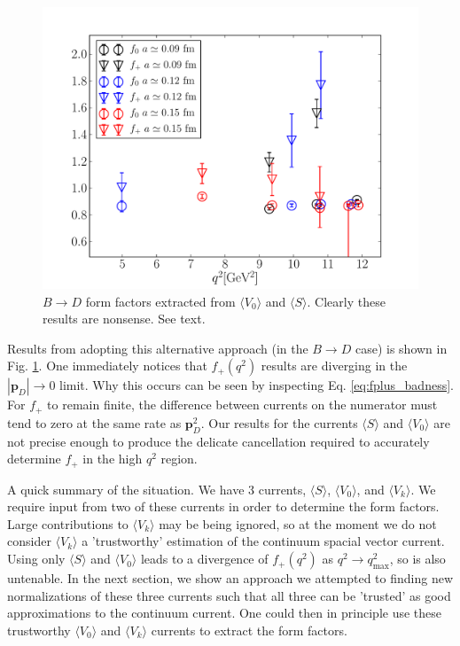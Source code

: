 \begin{figure}[htb!]
  \begin{center}
    \includegraphics[width=1.0\textwidth]{images/nrqcd/BD_formfactors_fromV0S.pdf}
  \end{center}
  \caption{$B\to D$ form factors extracted from $\langle V_0 \rangle$ and $\langle S \rangle$. Clearly these results are nonsense. See text. \label{fig:f0fp_fromV0S}}
\end{figure}

Results from adopting this alternative approach (in the $B\to D$ case) is shown in Fig. \ref{fig:f0fp_fromV0S}. One immediately notices that $f_+(q^2)$ results are diverging in the $|{\textbf{p}}_{D}| \to 0$ limit. Why this occurs can be seen by inspecting Eq. \eqref{eq:fplus_badness}. For $f_+$ to remain finite, the difference between currents on the numerator must tend to zero at the same rate as ${\textbf{p}}_D^2$. Our results for the currents $\langle S \rangle$ and $\langle V_0 \rangle$ are not precise enough to produce the delicate cancellation required to accurately determine $f_+$ in the high $q^2$ region.

A quick summary of the situation. We have 3 currents, $\langle S \rangle$, $\langle V_0 \rangle$, and $\langle V_k \rangle$. We require input from two of these currents in order to determine the form factors. Large contributions to $\langle V_k \rangle$ may be being ignored, so at the moment we do not consider $\langle V_k \rangle$ a 'trustworthy' estimation of the continuum spacial vector current. Using only $\langle S \rangle$ and $\langle V_0 \rangle$ leads to a divergence of $f_+(q^2)$ as $q^2\to q^2_{\text{max}}$, so is also untenable. In the next section, we show an approach we attempted to finding new normalizations of these three currents such that all three can be 'trusted' as good approximations to the continuum current. One could then in principle use these trustworthy $\langle V_0 \rangle$ and $\langle V_k \rangle$ currents to extract the form factors.

